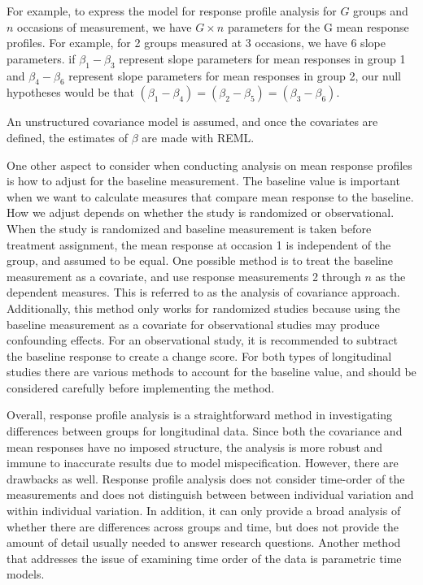 \documentclass[12pt, twoside]{amherstthesis}
\theoremstyle{definition}
\theoremstyle{definition}
\theoremstyle{definition}
\theoremstyle{remark}
\begin{document}
For example, to express the model for response profile analysis for \(G\) groups and \(n\) occasions of measurement, we have \(G \times n\) parameters for the G mean response profiles. For example, for 2 groups measured at 3 occasions, we have 6 slope parameters. if \(\beta_1 - \beta_3\) represent slope parameters for mean responses in group 1 and \(\beta_4 - \beta_6\) represent slope parameters for mean responses in group 2, our null hypotheses would be that \((\beta_1 - \beta_4) = (\beta_2-\beta_5) = (\beta_3-\beta_6)\).

An unstructured covariance model is assumed, and once the covariates are defined, the estimates of \(\beta\) are made with REML.

One other aspect to consider when conducting analysis on mean response profiles is how to adjust for the baseline measurement. The baseline value is important when we want to calculate measures that compare mean response to the baseline. How we adjust depends on whether the study is randomized or observational. When the study is randomized and baseline measurement is taken before treatment assignment, the mean response at occasion 1 is independent of the group, and assumed to be equal. One possible method is to treat the baseline measurement as a covariate, and use response measurements 2 through \(n\) as the dependent measures. This is referred to as the analysis of covariance approach. Additionally, this method only works for randomized studies because using the baseline measurement as a covariate for observational studies may produce confounding effects. For an observational study, it is recommended to subtract the baseline response to create a change score. For both types of longitudinal studies there are various methods to account for the baseline value, and should be considered carefully before implementing the method.

Overall, response profile analysis is a straightforward method in investigating differences between groups for longitudinal data. Since both the covariance and mean responses have no imposed structure, the analysis is more robust and immune to inaccurate results due to model mispecification. However, there are drawbacks as well. Response profile analysis does not consider time-order of the measurements and does not distinguish between between individual variation and within individual variation. In addition, it can only provide a broad analysis of whether there are differences across groups and time, but does not provide the amount of detail usually needed to answer research questions. Another method that addresses the issue of examining time order of the data is parametric time models.
\end{document}
